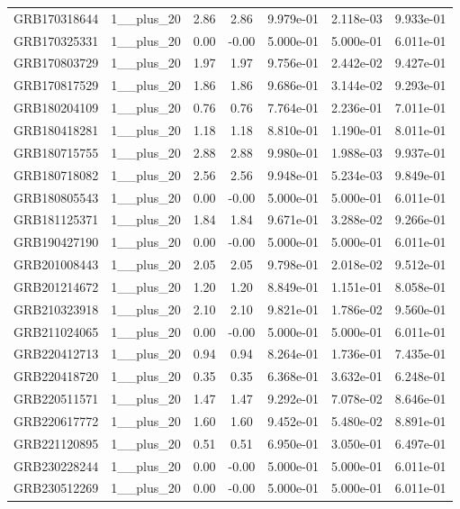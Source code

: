 \documentclass[12pt]{article}
\begin{document}
\begin{table}[h!]
{\begin{tabular}{l c c c c c c}
GRB170318644 & 1__plus_20 & 2.86 & 2.86 & 9.979e-01 & 2.118e-03 & 9.933e-01 \\
GRB170325331 & 1__plus_20 & 0.00 & -0.00 & 5.000e-01 & 5.000e-01 & 6.011e-01 \\
GRB170803729 & 1__plus_20 & 1.97 & 1.97 & 9.756e-01 & 2.442e-02 & 9.427e-01 \\
GRB170817529 & 1__plus_20 & 1.86 & 1.86 & 9.686e-01 & 3.144e-02 & 9.293e-01 \\
GRB180204109 & 1__plus_20 & 0.76 & 0.76 & 7.764e-01 & 2.236e-01 & 7.011e-01 \\
GRB180418281 & 1__plus_20 & 1.18 & 1.18 & 8.810e-01 & 1.190e-01 & 8.011e-01 \\
GRB180715755 & 1__plus_20 & 2.88 & 2.88 & 9.980e-01 & 1.988e-03 & 9.937e-01 \\
GRB180718082 & 1__plus_20 & 2.56 & 2.56 & 9.948e-01 & 5.234e-03 & 9.849e-01 \\
GRB180805543 & 1__plus_20 & 0.00 & -0.00 & 5.000e-01 & 5.000e-01 & 6.011e-01 \\
GRB181125371 & 1__plus_20 & 1.84 & 1.84 & 9.671e-01 & 3.288e-02 & 9.266e-01 \\
GRB190427190 & 1__plus_20 & 0.00 & -0.00 & 5.000e-01 & 5.000e-01 & 6.011e-01 \\
GRB201008443 & 1__plus_20 & 2.05 & 2.05 & 9.798e-01 & 2.018e-02 & 9.512e-01 \\
GRB201214672 & 1__plus_20 & 1.20 & 1.20 & 8.849e-01 & 1.151e-01 & 8.058e-01 \\
GRB210323918 & 1__plus_20 & 2.10 & 2.10 & 9.821e-01 & 1.786e-02 & 9.560e-01 \\
GRB211024065 & 1__plus_20 & 0.00 & -0.00 & 5.000e-01 & 5.000e-01 & 6.011e-01 \\
GRB220412713 & 1__plus_20 & 0.94 & 0.94 & 8.264e-01 & 1.736e-01 & 7.435e-01 \\
GRB220418720 & 1__plus_20 & 0.35 & 0.35 & 6.368e-01 & 3.632e-01 & 6.248e-01 \\
GRB220511571 & 1__plus_20 & 1.47 & 1.47 & 9.292e-01 & 7.078e-02 & 8.646e-01 \\
GRB220617772 & 1__plus_20 & 1.60 & 1.60 & 9.452e-01 & 5.480e-02 & 8.891e-01 \\
GRB221120895 & 1__plus_20 & 0.51 & 0.51 & 6.950e-01 & 3.050e-01 & 6.497e-01 \\
GRB230228244 & 1__plus_20 & 0.00 & -0.00 & 5.000e-01 & 5.000e-01 & 6.011e-01 \\
GRB230512269 & 1__plus_20 & 0.00 & -0.00 & 5.000e-01 & 5.000e-01 & 6.011e-01 \\

\end{tabular}}
\end{table}
\end{document}
